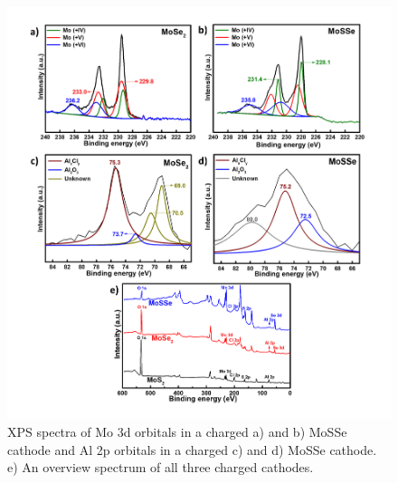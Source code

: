 \begin{figure}
  \centering
  \includegraphics[width=\textwidth]{Figures/chap4fig/MoAlOverallMoSeMoSSe}
  \caption{XPS spectra of Mo 3d orbitals in a charged a)  and b) MoSSe cathode and Al 2p orbitals in a charged c)  and d) MoSSe cathode. e) An overview spectrum of all three charged cathodes.}
  \label{Figures/chap4fig:MoAlOverallMoSeMoSSe}
\end{figure}
